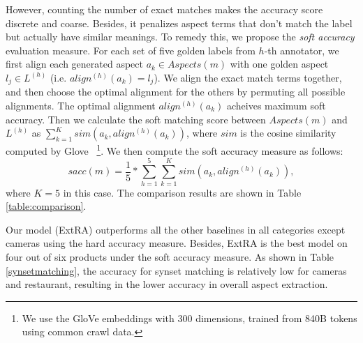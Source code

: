 \documentclass[11pt,a4paper]{article}
\newcommand{\tabref}[1]{Table \ref{#1}}
\begin{document}
However, counting the number of exact matches 
makes the accuracy score discrete and coarse. 
Besides, it penalizes aspect terms that don't match the label
but actually have similar meanings.
To remedy this, we propose the \emph{soft accuracy}  evaluation measure.
For each set of five golden labels from 
$h$-th annotator, we first align each generated aspect $a_k \in Aspects(m)$
with one golden aspect $l_j \in L^{(h)}$ (i.e. $align^{(h)}(a_{k})=l_{j}$). 
We align the exact match terms together, and then choose the optimal alignment for the others by permuting all possible alignments. 
The optimal alignment $align^{(h)}(a_k)$ acheives maximum soft accuracy.
Then we calculate the soft matching score between
$Aspects(m)$ and $L^{(h)}$ as $\sum_{k=1}^{K}sim(a_{k}, align^{(h)}(a_k))$,
where $sim$ is the cosine similarity computed by 
Glove~
\footnote{ We use the GloVe embeddings 
	with 300 dimensions, trained from 840B tokens using common crawl data. }. 
We then compute the soft accuracy measure as follows:
\begin{equation}
sacc(m) =\frac{1}{5}*\sum_{h=1}^{5}\sum_{k=1}^{K}sim(a_k, align^{(h)}(a_k)), 
\end{equation}
where $K=5$ in this case.
The comparison results are shown 
in \tabref{table:comparison}. 

Our model (ExtRA) outperforms all the other baselines 
in all categories except cameras using the hard accuracy measure.
Besides, ExtRA is the best model on four out of six products under the 
soft accuracy measure. As shown in \tabref{synsetmatching}, the accuracy for
synset matching is relatively low for cameras and restaurant,
resulting in the lower accuracy in overall aspect extraction.
\end{document}
